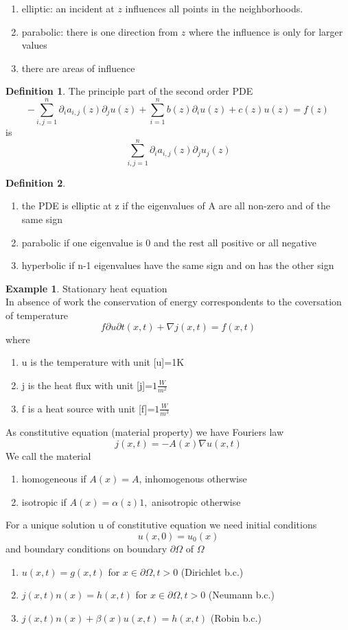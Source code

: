 \documentclass[english]{article}
\theoremstyle{definition}
\newtheorem*{defi}{Definition}
\newtheorem*{exa}{Example}
\theoremstyle{remark}
\newcommand{\f}[2]{\frac{#1}{#2}}							%
\newcommand{\p}{\partial}
\renewcommand{\aa}{\alpha}		%
\newcommand{\bb}{\beta}					%
\newcommand{\OO}{\Omega}
\newcommand{\tri}{\nabla}
\begin{document}
\begin{enumerate}
\item elliptic: an incident at $z$ influences all points in the neighborhoods.
\item parabolic: there is one direction from $z$ where the influence is only for larger values
\item there are areas of influence
\end{enumerate}
\begin{defi} The principle part of the second order PDE
  $$-\sum_{i,j=1}^n \p_i a_{i,j}(z)\p_j u(z) + \sum_{i=1}^n b(z)\p_i u(z) + c(z) u(z) = f(z)$$
  is $$\sum_{i,j=1}^n \p_i a_{i,j}(z) \p_j u_j(z)$$
\end{defi}
\begin{defi}
  \begin{enumerate}
  \item the PDE is elliptic at z if the eigenvalues of A are all non-zero and of the same sign
  \item parabolic if one eigenvalue is 0 and the rest all positive or all negative
  \item hyperbolic if n-1 eigenvalues have the same sign and on has the other sign
  \end{enumerate}
\end{defi}

\begin{exa} Stationary heat equation\\
  In absence of work the conservation of energy correspondents to the coversation of temperature
  $$f{\p u}{\p t}(x,t) + \tri j (x,t)= f(x,t)$$
  where
  \begin{enumerate}
  \item u is the temperature with unit [u]=1K
  \item j is the heat flux with unit [j]=$1\f{W}{m^2}$
  \item f is a heat source with unit [f]=$1\f{W}{m^3}$
  \end{enumerate}
  As constitutive equation (material property) we have Fouriers law 
  $$j(x,t)=-A(x)\tri u(x,t)$$
  We call the material 
  \begin{enumerate}
  \item homogeneous if $A(x)=A$, inhomogenous otherwise
  \item isotropic if $A(x)= \aa(z)1,$ anisotropic otherwise
  \end{enumerate}
\end{exa}
For a unique solution u of constitutive equation we need initial conditions
$$u(x,0)= u_0 (x)$$
and boundary conditions on boundary $\p \OO$ of $\OO$
\begin{enumerate}
\item $u(x,t)= g(x,t)$ for $x \in \p \OO, t>0$ (Dirichlet b.c.)
\item $j(x,t) n(x) = h(x,t)$ for $x \in \p\OO, t>0$ (Neumann b.c.)
\item $j(x,t) n(x) + \bb(x) u(x,t) = h(x,t)$ (Robin b.c.)
\end{enumerate}
\end{document}
